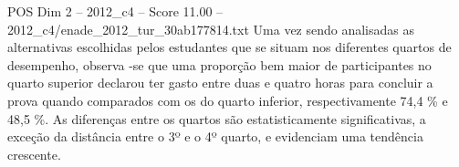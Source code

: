 \begin{textsample}{POS Dim 2 – 2012\_c4 – Score 11.00 – 2012\_c4/enade\_2012\_tur\_30ab177814.txt}
Uma vez sendo analisadas as alternativas escolhidas pelos estudantes que se situam nos diferentes quartos de desempenho, observa -se que uma proporção bem maior de participantes no quarto superior declarou ter gasto entre duas e quatro horas para concluir a prova quando comparados com os do quarto inferior, respectivamente 74,4 \% e 48,5 \%.
As diferenças entre os quartos são estatisticamente significativas, a exceção da distância entre o 3º e o 4º quarto, e evidenciam uma tendência crescente.

\end{textsample}
